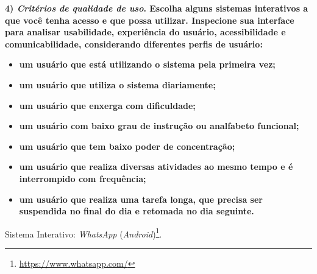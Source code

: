 \documentclass[
	article,			%
	11pt,				%
	oneside,			%
	a4paper,			%
	english,			%
	brazil,				%
	sumario=tradicional
	]{abntex2}
\begin{document}
\textbf{4) \textit{Critérios de qualidade de uso}. Escolha alguns sistemas interativos a que você tenha acesso e que possa utilizar. Inspecione sua interface para analisar usabilidade, experiência do usuário, acessibilidade e comunicabilidade, considerando diferentes perfis de usuário:}

\begin{itemize}
	\item \textbf{um usuário que está utilizando o sistema pela primeira vez;}
	\item \textbf{um usuário que utiliza o sistema diariamente;}
	\item \textbf{um usuário que enxerga com dificuldade;}
	\item \textbf{um usuário com baixo grau de instrução ou analfabeto funcional;}
	\item \textbf{um usuário que tem baixo poder de concentração;}
	\item \textbf{um usuário que realiza diversas atividades ao mesmo tempo e é interrompido com frequência;}
	\item \textbf{um usuário que realiza uma tarefa longa, que precisa ser suspendida no final do dia e retomada no dia seguinte.}	
\end{itemize}


Sistema Interativo: \textit{WhatsApp} (\textit{Android})\footnote{\href{https://www.whatsapp.com/}{https://www.whatsapp.com/}}.
\end{document}

